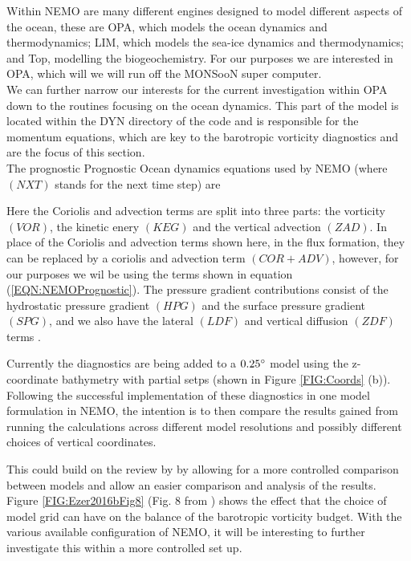 \documentclass[..\EOYR.tex]{subfiles}
\begin{document}
Within NEMO are many different engines designed to model different aspects of the ocean, these are OPA, which models the ocean dynamics and thermodynamics; LIM, which models the sea-ice dynamics and thermodynamics; and Top, modelling the biogeochemistry. For our purposes we are interested in OPA, which will we will run off the MONSooN super computer.\\
We can further narrow our interests for the current investigation within OPA down to the routines focusing on the ocean dynamics. This part of the model is located within the DYN directory of the code and is responsible for the momentum equations, which are key to the barotropic vorticity diagnostics and are the focus of this section. \\

The prognostic Prognostic Ocean dynamics equations used by NEMO (where $(NXT)$ stands for the next time step) are 


Here the Coriolis and advection terms are split into three parts: the vorticity $(VOR)$, the kinetic enery $(KEG)$ and the vertical advection $(ZAD)$.
In place of the Coriolis and advection terms shown here, in the flux formation, they can be replaced by a coriolis and advection term $(COR + ADV)$, however, for our purposes we wil be using the terms shown in equation (\ref{EQN:NEMOPrognostic}). The pressure gradient contributions consist of the hydrostatic pressure gradient $(HPG)$ and the surface pressure gradient $(SPG)$, and we also have the lateral $(LDF)$ and vertical diffusion $(ZDF)$ terms \citep{Madec2011}.

Currently the diagnostics are being added to a $0.25\degree$ model using the z-coordinate bathymetry with partial setps (shown in Figure \ref{FIG:Coords} (b)).
Following the successful implementation of these diagnostics in one model formulation in NEMO, the intention is to then compare the results gained from running the calculations across different model resolutions and possibly different choices of vertical coordinates.

This could build on the review by \citep{Ezer2016b} by allowing for a more controlled comparison between models and allow an easier comparison and analysis of the results. Figure \ref{FIG:Ezer2016bFig8} (Fig. 8 from \citep{Ezer2016b}) shows the effect that the choice of model grid can have on the balance of the barotropic vorticity budget. With the various available configuration of NEMO, it will be interesting to further investigate this within a more controlled set up.
\end{document}
